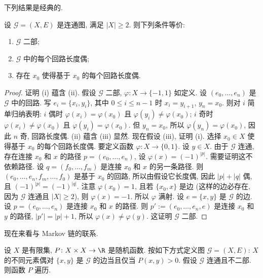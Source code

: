 下列结果是经典的.

\begin{proposition}[二部图判据]
\label{prop:VI.3.2}
设 $\mathcal{G} = (X, E)$ 是连通图, 满足 $|X| \geq 2$. 则下列条件等价:
\begin{enumerate}
\item[(i)] $\mathcal{G}$ 二部;
\item[(ii)] $\mathcal{G}$ 中的每个回路长度偶;
\item[(iii)] 存在 $x_0$ 使得基于 $x_0$ 的每个回路长度偶.
\end{enumerate}
\end{proposition}

\begin{proof}
证明 (i) 蕴含 (ii). 假设 $\mathcal{G}$ 二部, $\varphi \colon X \to \{-1, 1\}$ 如定义. 设 $(e_0, \ldots, e_n)$ 是 $\mathcal{G}$ 中的回路. 写 $e_i = \{x_i, y_i\}$, 其中 $0 \leq i \leq n - 1$ 时 $x_i = y_{i+1}$, $y_n = x_0$. 则对 $i$ 简单归纳表明: $i$ 偶时 $\varphi(x_i) = \varphi(x_0)$ 且 $\varphi(y_i) \neq \varphi(x_0)$; $i$ 奇时 $\varphi(x_i) \neq \varphi(x_0)$ 且 $\varphi(y_i) = \varphi(x_0)$. 但 $y_n = x_0$, 所以 $\varphi(y_n) = \varphi(x_0)$, 因此 $n$ 奇, 回路长度偶.
(ii) 蕴含 (iii) 显然. 现在假设 (iii), 证明 (i). 选择 $x_0 \in X$ 使得基于 $x_0$ 的每个回路长度偶. 要定义函数 $\varphi \colon X \to \{0, 1\}$. 设 $y \in X$. 由于 $\mathcal{G}$ 连通, 存在连接 $x_0$ 和 $x$ 的路径 $p = (e_0, \ldots, e_n)$, 设 $\varphi(x) = (-1)^{|p|}$. 需要证明这不依赖路径. 设 $q = (f_0, \ldots, f_m)$ 是连接 $x_0$ 和 $x$ 的另一条路径. 则 $(e_0, \ldots, e_n, f_m, \ldots, f_0)$ 是基于 $x_0$ 的回路, 所以由假设它长度偶, 因此 $|p| + |q|$ 偶, 且 $(-1)^{|p|} = (-1)^{|q|}$. 注意 $\varphi(x_0) = 1$, 且若 $\{x_0, x\}$ 是边 (这样的边必存在, 因为 $\mathcal{G}$ 连通且 $|X| \geq 2$), 则 $\varphi(x) = -1$. 所以 $\varphi$ 满射. 设 $e = \{x, y\}$ 是 $\mathcal{G}$ 的边. 设 $p = (e_0, \ldots, e_n)$ 是连接 $x_0$ 和 $x$ 的路径. 则 $p' := (e_0, \ldots, e_n, e)$ 是连接 $x_0$ 和 $y$ 的路径, $|p'| = |p| + 1$, 所以 $\varphi(x) \neq \varphi(y)$. 这证明 $\mathcal{G}$ 二部.
\end{proof}

现在来看与 Markov 链的联系.

\begin{proposition}[图的连通性与遍历性]
\label{prop:VI.3.3}
设 $X$ 是有限集, $P \colon X \times X \to \R$ 是随机函数. 按如下方式定义图 $\mathcal{G} = (X, E)$: $X$ 的不同元素偶对 $\{x, y\}$ 是 $\mathcal{G}$ 的边当且仅当 $P(x, y) > 0$.
假设 $\mathcal{G}$ 连通且不二部. 则函数 $P$ 遍历.
\end{proposition}

